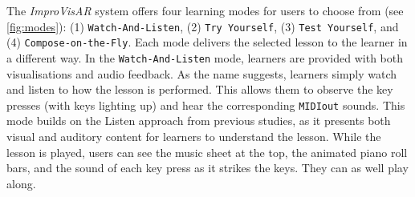 \documentclass{vgtc}                          %
\begin{document}
\par %
The \textit{ImproVisAR} system offers four learning modes for users to choose from (see \autoref{fig:modes}): (1) \texttt{Watch-And-Listen}, (2) \texttt{Try Yourself}, (3) \texttt{Test Yourself}, and (4) \texttt{Compose-on-the-Fly}. Each mode delivers the selected lesson to the learner in a different way. In the \texttt{Watch-And-Listen} mode, learners are provided with both visualisations and audio feedback. As the name suggests, learners simply watch and listen to how the lesson is performed. This allows them to observe the key presses (with keys lighting up) and hear the corresponding \texttt{MIDIout} sounds. This mode builds on the Listen approach from previous studies, as it presents both visual and auditory content for learners to understand the lesson. While the lesson is played, users can see the music sheet at the top, the animated piano roll bars, and the sound of each key press as it strikes the keys. They can as well play along.
\end{document}
